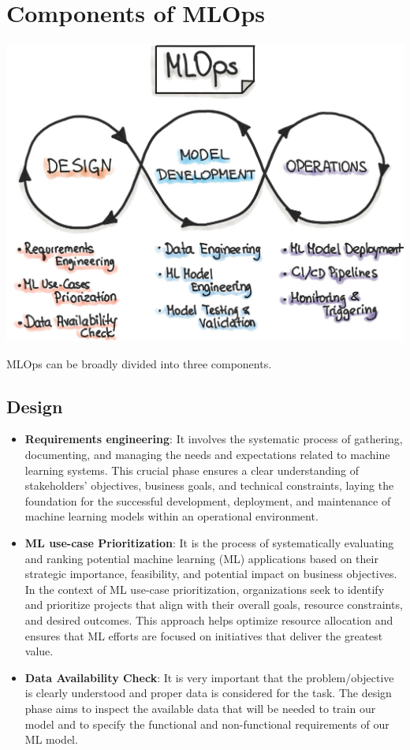 \documentclass[12pt]{article}
\begin{document}
\newpage 

\section{Components of MLOps}

\includegraphics[width = 15cm, height = 10cm]{MLOPS.jpg}

MLOps can be broadly divided into three components.

\subsection{Design}
\begin{itemize}
    \item \textbf{Requirements engineering}: It involves the systematic process of gathering, documenting, and managing the needs and expectations related to machine learning systems. This crucial phase ensures a clear understanding of stakeholders' objectives, business goals, and technical constraints, laying the foundation for the successful development, deployment, and maintenance of machine learning models within an operational environment.

    \item \textbf{ML use-case Prioritization}: It is the process of systematically evaluating and ranking potential machine learning (ML) applications based on their strategic importance, feasibility, and potential impact on business objectives. In the context of ML use-case prioritization, organizations seek to identify and prioritize projects that align with their overall goals, resource constraints, and desired outcomes. This approach helps optimize resource allocation and ensures that ML efforts are focused on initiatives that deliver the greatest value.

    \item \textbf{Data Availability Check}: It is very important that the problem/objective is clearly understood and proper data is considered for the task.
    The design phase aims to inspect the available data that will be needed to train our model and to specify the functional and non-functional requirements of our ML model.
\end{itemize}
\end{document}
